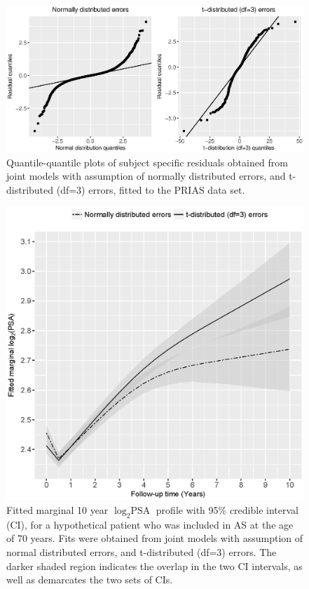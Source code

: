 \begin{enumerate}
    \begin{figure}[!htb]
    \centerline{\includegraphics[width=\columnwidth]{images/model_fit/qqplot_norm_t3.eps}}
    \caption{Quantile-quantile plots of subject specific residuals obtained from joint models with assumption of normally distributed errors, and t-distributed (df=3) errors, fitted to the PRIAS data set.}
    \label{fig : qqplot_norm_t3_ref2}
    \end{figure}

\begin{figure}[!htb]
    \centerline{\includegraphics[width=0.75\columnwidth]{images/model_fit/marginal_fitted_psa_NormalVsT3.eps}}
    \caption{Fitted marginal 10 year $\log_2 \mbox{PSA}$ profile with 95\% credible interval (CI), for a hypothetical patient who was included in AS at the age of 70 years. Fits were obtained from joint models with assumption of normal distributed errors, and t-distributed (df=3) errors. The darker shaded region indicates the overlap in the two CI intervals, as well as demarcates the two sets of CIs.}
    \label{fig : marginal_fitted_psa_NormalVsT3_ref2}
    \end{figure}        
    

\end{enumerate}
